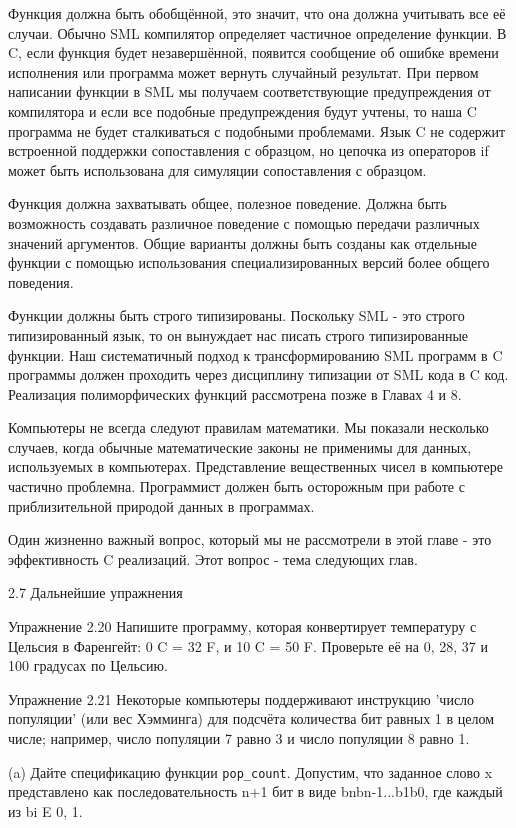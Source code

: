 Функция должна быть обобщённой, это значит, что она должна учитывать все её случаи. Обычно SML компилятор определяет частичное определение функции. В C, если функция будет незавершённой, появится сообщение об ошибке времени исполнения или программа может вернуть случайный результат. При первом написании функции в SML мы получаем соответствующие предупреждения от компилятора и если все подобные предупреждения будут учтены, то наша C программа не будет сталкиваться с подобными проблемами. Язык C не содержит встроенной поддержки сопоставления с образцом, но цепочка из операторов if может быть использована для симуляции сопоставления с образцом.

Функция должна захватывать общее, полезное поведение. Должна быть возможность создавать различное поведение с помощью передачи различных значений аргументов. Общие варианты должны быть созданы как отдельные функции с помощью использования специализированных версий более общего поведения.

Функции должны быть строго типизированы. Поскольку SML - это строго типизированный язык, то он вынуждает нас писать строго типизированные функции. Наш систематичный подход к трансформированию SML программ в C программы должен проходить через дисциплину типизации от SML кода в C код. Реализация полиморфических функций рассмотрена позже в Главах 4 и 8.

Компьютеры не всегда следуют правилам математики. Мы показали несколько случаев, когда обычные математические законы не применимы для данных, используемых в компьютерах. Представление вещественных чисел в компьютере частично проблемна. Программист должен быть осторожным при работе с приблизительной природой данных в программах.

Один жизненно важный вопрос, который мы не рассмотрели в этой главе - это эффективность C реализаций. Этот вопрос - тема следующих глав.

2.7 Дальнейшие упражнения

Упражнение 2.20 Напишите программу, которая конвертирует температуру с Цельсия в Фаренгейт: 0 C = 32 F, и 10 C = 50 F. Проверьте её на 0, 28, 37 и 100 градусах по Цельсию.

Упражнение 2.21 Некоторые компьютеры поддерживают инструкцию 'число популяции' (или вес Хэмминга) для подсчёта количества бит равных 1 в целом числе; например, число популяции 7 равно 3 и число популяции 8 равно 1.

(a) Дайте спецификацию функции \lstinline|pop_count|. Допустим, что заданное слово x представлено как последовательность n+1 бит в виде bnbn-1...b1b0, где каждый из bi E {0, 1}.

